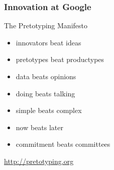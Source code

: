 \begin{frame}
\frametitle{Innovation at Google}

The Pretotyping Manifesto

\begin{itemize}
    \item innovators beat ideas 
    \item pretotypes beat productypes 
    \item data beats opinions 
    \item doing beats talking 
    \item simple beats complex 
    \item now beats later 
    \item commitment beats committees
\end{itemize}

\url{http://pretotyping.org}

\end{frame}
